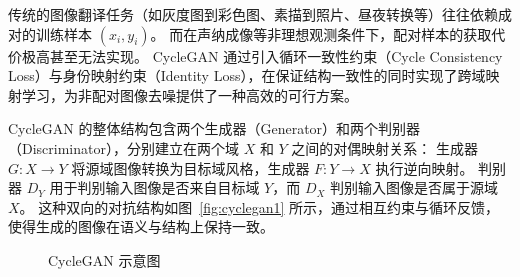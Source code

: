 传统的图像翻译任务（如灰度图到彩色图、素描到照片、昼夜转换等）往往依赖成对的训练样本 $(x_i, y_i)$。
而在声纳成像等非理想观测条件下，配对样本的获取代价极高甚至无法实现。
CycleGAN 通过引入循环一致性约束（Cycle Consistency Loss）与身份映射约束（Identity Loss），在保证结构一致性的同时实现了跨域映射学习，为非配对图像去噪提供了一种高效的可行方案。

CycleGAN 的整体结构包含两个生成器（Generator）和两个判别器（Discriminator），分别建立在两个域 $X$ 和 $Y$ 之间的对偶映射关系：
生成器 $G: X \rightarrow Y$ 将源域图像转换为目标域风格，生成器 $F: Y \rightarrow X$ 执行逆向映射。
判别器 $D_Y$ 用于判别输入图像是否来自目标域 $Y$，而 $D_X$ 判别输入图像是否属于源域 $X$。
这种双向的对抗结构如图~\ref{fig:cyclegan1} 所示，通过相互约束与循环反馈，使得生成的图像在语义与结构上保持一致。

\begin{figure}[!ht]
	\setlength{\subfigcapskip}{-1bp}
	\centering
	\begin{minipage}{\textwidth}
	  \centering
	  \hspace{0.1em}
	  \hspace{0.1em}
	\end{minipage}
	\caption{CycleGAN 示意图}
	\label{fig:cyclegan原理} %
  \end{figure}

